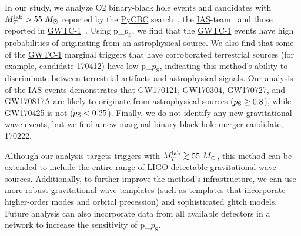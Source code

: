 \documentclass[
 nofootinbib,
 amsmath,amssymb,
 aps,
 twocolumn,
 superscriptaddress
]{revtex4-2}
\newcommand{\pycbc}{{\sc \href{https://pycbc.org/}{{PyCBC}}}\xspace}
\newcommand{\GWTC}{{\sc \href{https://ui.adsabs.harvard.edu/abs/2019PhRvX...9c1040A/abstract}{{GWTC-1}}}\xspace}
\newcommand{\IAS}{{\sc \href{https://ui.adsabs.harvard.edu/abs/2020PhRvD.101h3030V/abstract}{{IAS}}}\xspace}
\newcommand{\fancytext}[1]{{\relax\ifmmode#1\else $#1$\fi}\xspace}
\newcommand{\mathcmd}[1]{{\sc \relax\ifmmode#1\else $#1$\fi}\xspace}
\newcommand{\msun}{\mathcmd{M_\odot}}
\newcommand{\totMlab}{\mathcmd{M_T^{\rm{lab}}}}
\newcommand{\pastrobcr}{\fancytext{p_\text{S}}}
\begin{document}
In our study, we analyze O2 binary-black hole events and candidates with $\totMlab > 55~\msun$ reported by the \pycbc search~\cite{pycbc_ogc_2}, the \IAS-team~\cite{IAS1, IAS2} and those reported in \GWTC~\cite{GWTC1}. Using \pastrobcr, we find that the \GWTC events have high probabilities of originating from an astrophysical source. We also find that some of the \GWTC marginal triggers that have corroborated terrestrial sources (for example, candidate 170412) have low \pastrobcr, indicating this method's ability to discriminate between terrestrial artifacts and astrophysical signals. Our analysis of the \IAS events demonstrates that GW170121, GW170304, GW170727, and GW170817A are likely to originate from astrophysical sources ($\pastrobcr\geq0.8$), while GW170425 is not ($\pastrobcr<0.25$). Finally, we do not identify any new gravitational-wave events, but we find a new marginal binary-black hole merger candidate, 170222. 

Although our analysis targets triggers with $\totMlab \gtrsim 55~\msun$, this method can be extended to include the entire range of LIGO-detectable gravitational-wave sources. Additionally, to further improve the method's infrastructure, we can use more robust gravitational-wave templates (such as templates that incorporate higher-order modes and orbital precession) and sophisticated glitch models. Future analysis can also incorporate data from all available detectors in a network to increase the sensitivity of \pastrobcr. 
\end{document}
